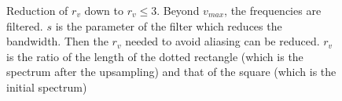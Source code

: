 		
		\begin{figure}
		\centering
		\caption{Reduction of $r_v$ down to $r_v \leq 3$. Beyond $v_{max}$, the frequencies are filtered. $s$ is the parameter of the filter which reduces the bandwidth. Then the $r_v$ needed to avoid aliasing can be reduced. $r_v$ is the ratio of the length of the dotted rectangle (which is the spectrum after the upsampling) and that of the square (which is the initial spectrum)}
		\label{rvleq3}
		\end{figure}


